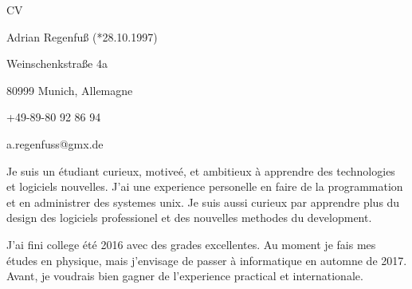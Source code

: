 \documentclass[11pt,a4paper]{article}
\begin{document}
\thispagestyle{empty}
\pagestyle{empty}

{\bf\centerline{{\huge CV}}}
\vspace{6pt}

\centerline{Adrian Regenfuß (*28.10.1997)}
\centerline{Weinschenkstraße 4a}
\centerline{80999 Munich, Allemagne}
\centerline{+49-89-80 92 86 94}
\centerline{a.regenfuss@gmx.de}

\vspace{5pt}

Je suis un étudiant curieux, motiveé, et ambitieux à apprendre des technologies
et logiciels nouvelles. J'ai une experience personelle en faire de la programmation
et en administrer des systemes unix. Je suis aussi curieux par apprendre plus
du design des logiciels professionel et des nouvelles methodes du development.

J'ai fini college été 2016 avec des grades excellentes. Au moment je fais mes études
en physique, mais j'envisage de passer à informatique en automne de 2017. Avant, je voudrais
bien gagner de l'experience practical et internationale.
\end{document}
